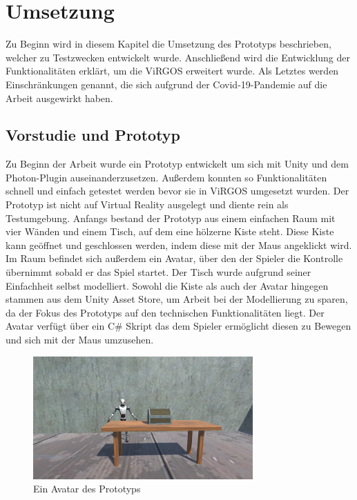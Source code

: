 \section{Umsetzung} \label{Umsetzung}
Zu Beginn wird in diesem Kapitel die Umsetzung des Prototyps beschrieben, welcher zu Testzwecken entwickelt wurde. Anschließend wird die Entwicklung der Funktionalitäten erklärt, um die ViRGOS erweitert wurde. Als Letztes werden Einschränkungen genannt, die sich aufgrund der Covid-19-Pandemie auf die Arbeit ausgewirkt haben.

\subsection{Vorstudie und Prototyp} \label{Vorstudie}
Zu Beginn der Arbeit wurde ein Prototyp entwickelt um sich mit Unity und dem Photon-Plugin auseinanderzusetzen. Außerdem konnten so Funktionalitäten schnell und einfach getestet werden bevor sie in ViRGOS umgesetzt wurden. Der Prototyp ist nicht auf Virtual Reality ausgelegt und diente rein als Testumgebung. Anfangs bestand der Prototyp aus einem einfachen Raum mit vier Wänden und einem Tisch, auf dem eine hölzerne Kiste steht. Diese Kiste kann geöffnet und geschlossen werden, indem diese mit der Maus angeklickt wird. Im Raum befindet sich außerdem ein Avatar, über den der Spieler die Kontrolle übernimmt sobald er das Spiel startet. Der Tisch wurde aufgrund seiner Einfachheit selbst modelliert. Sowohl die Kiste als auch der Avatar hingegen stammen aus dem Unity Asset Store, um Arbeit bei der Modellierung zu sparen, da der Fokus des Prototyps auf den technischen Funktionalitäten liegt. Der Avatar verfügt über ein C\# Skript das dem Spieler ermöglicht diesen zu Bewegen und sich mit der Maus umzusehen.\\

\begin{figure}[H]
\centering
\includegraphics[width=0.75\textwidth]{InteractivityPrototype.PNG}
\caption{Ein Avatar des Prototyps}
\end{figure}

